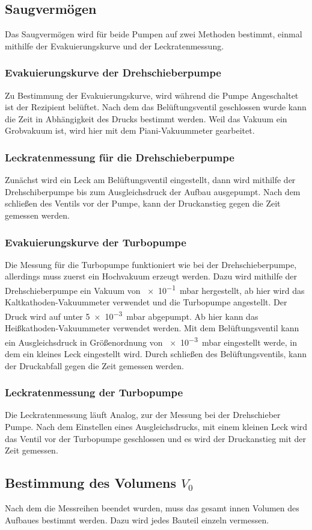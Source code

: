 \subsection{Saugvermögen}
Das Saugvermögen wird für beide Pumpen auf zwei Methoden bestimmt, einmal mithilfe der Evakuierungskurve und der Leckratenmessung.
\subsubsection{Evakuierungskurve der Drehschieberpumpe}
Zu Bestimmung der Evakuierungskurve, wird während die Pumpe Angeschaltet ist der Rezipient belüftet. Nach dem das Belüftungsventil geschlossen wurde kann die Zeit in Abhängigkeit des Drucks bestimmt werden. 
Weil das Vakuum ein Grobvakuum ist, wird hier mit dem Piani-Vakuummeter gearbeitet.
\subsubsection{Leckratenmessung für die Drehschieberpumpe}
Zunächst wird ein Leck am Belüftungsventil eingestellt, dann wird mithilfe der Drehschiberpumpe bis zum Ausgleichsdruck der Aufbau ausgepumpt. Nach dem schließen des Ventils vor der Pumpe, kann der Druckanstieg gegen die Zeit gemessen werden. 
\subsubsection{Evakuierungskurve der Turbopumpe}
Die Messung für die Turbopumpe funktioniert wie bei der Drehschieberpumpe, allerdings muss zuerst ein Hochvakuum erzeugt werden. Dazu wird mithilfe der Drehschieberpumpe ein Vakuum von \SI{e-1}{\milli\bar} hergestellt, ab hier wird das Kaltkathoden-Vakuummeter verwendet und die Turbopumpe angestellt. Der Druck wird auf unter \SI{5e-3}{\milli\bar} abgepumpt. Ab hier kann das Heißkathoden-Vakuummeter verwendet werden. Mit dem Belüftungsventil kann ein Ausgleichsdruck in Größenordnung von \SI{e-3}{\milli\bar} eingestellt werde, in dem ein kleines Leck eingestellt wird. Durch schließen des Belüftungsventils, kann der Druckabfall gegen die Zeit gemessen werden.
\subsubsection{Leckratenmessung der Turbopumpe}
Die Leckratenmessung läuft Analog, zur der Messung bei der Drehschieber Pumpe. Nach dem Einstellen eines Ausgleichsdrucks, mit einem kleinen Leck wird das Ventil vor der Turbopumpe geschlossen und es wird der Druckanstieg mit der Zeit gemessen.
\subsection{Bestimmung des Volumens $V_0$}
Nach dem die Messreihen beendet wurden, muss das gesamt innen Volumen des Aufbaues bestimmt werden. Dazu wird jedes Bauteil einzeln vermessen.